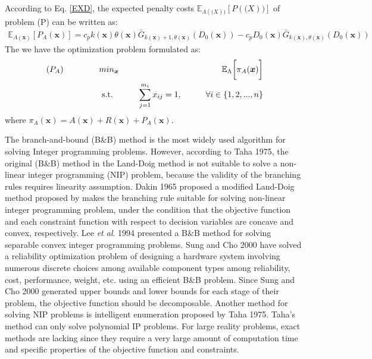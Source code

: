 \documentclass[preprint,12pt]{elsarticle}
\begin{document}
According to Eq. \eqref{EXD}, the expected penalty costs $\mathbb{E}_{\Lambda(\boldsymbol(X))}[P(\boldsymbol(X))]$ of problem (P) can be written as:
\begin{eqnarray}
\mathbb{E}_{\Lambda(\boldsymbol{x})}[P_{A}(\boldsymbol{x})]=c_{p}k(\boldsymbol{x})\theta(\boldsymbol{x}) \bar{G}_{k(\boldsymbol{x})+1,\theta(\boldsymbol{x})}(D_{0}(\boldsymbol{x})) -c_{p}D_{0}(\boldsymbol{x})\bar{G}_{k(\boldsymbol{x}),\theta(\boldsymbol{x})}(D_{0}(\boldsymbol{x}))
\end{eqnarray}
The we have the optimization problem formulated as:
\begin{eqnarray}
\text{($P_{A}$)} \hspace{15mm} & min_{\boldsymbol{x}} & \hspace{10mm} \mathbb{E}_{\Lambda} \bigg[ \pi_{A}(\boldsymbol{x})\bigg] \nonumber\\
& \text{ s.t. }&  \hspace{5mm} \sum_{j=1}^{m_i}{x_{ij}}=1, \hspace{10mm} \forall i \in \{1,2,...,n\} \nonumber
\end{eqnarray}
where $\pi_{A}(\boldsymbol{x})=A(\boldsymbol{x})+R(\boldsymbol{x})+P_{A}(\boldsymbol{x})$.
  
  
The branch-and-bound (B\&B) method is the most widely used algorithm for solving Integer programming problems. However, according to Taha 1975, the original (B\&B) method in the Land-Doig method is not suitable to solve a non-linear integer programming (NIP) problem, because the validity of the branching rules requires linearity assumption. Dakin 1965 proposed a modified Land-Doig method proposed by makes the branching rule suitable for solving non-linear integer programming problem, under the condition that the objective function and each constraint function with respect to decision variables are concave and convex, respectively. Lee \textit {et al}. 1994 presented a B\&B method for solving separable convex integer programming problems. Sung and Cho 2000 have solved a reliability optimization problem of designing a hardware system involving numerous discrete choices among available component types among reliability, cost, performance, weight, etc. using an efficient B\&B problem. Since Sung and Cho 2000 generated upper bounds and lower bounds for each stage of their problem, the objective function should be decomposable. Another method for solving NIP problems is intelligent enumeration proposed by Taha 1975. Taha's method can only solve polynomial IP problems. For large reality problems, exact methods are lacking since they require a very large amount of computation time and specific properties of the objective function and constraints.
\end{document}
